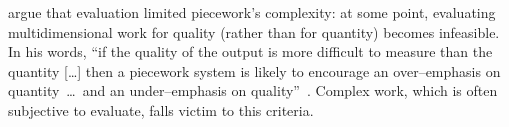 \documentclass[trackingWork]{subfiles}
\begin{document}
\citeauthor{hart2016rise} argue that evaluation limited piecework's complexity:
at some point, evaluating multidimensional work for quality
(rather than for quantity) becomes infeasible.
In his words,
``if the quality of the output is more difficult to measure than the quantity [\ldots]
then a piecework system is likely to encourage
an over--emphasis on quantity~\dots~and an under--emphasis on quality''~\cite{hart2016rise}.
Complex work, which is often subjective to evaluate, falls victim to this criteria.




\end{document}
